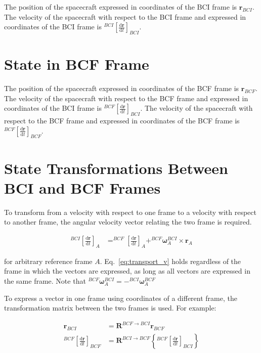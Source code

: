 \documentclass[]{article}
\newcommand{\vb}[1]{\bm{#1}} %
\newcommand{\ddt}[1]{\frac{\mathrm{d} #1}{\mathrm{d} t}} %
\begin{document}
The position of the spacecraft expressed in coordinates of the BCI frame is $\vb{r}_{BCI}$. The velocity of the spacecraft with respect to the BCI frame and expressed in coordinates of the BCI frame is $^{BCI} \left[ \ddt{\vb{r}} \right]_{BCI}$.

\section{State in BCF Frame}
\label{sec:bcf_state}

The position of the spacecraft expressed in coordinates of the BCF frame is $\vb{r}_{BCF}$. The velocity of the spacecraft with respect to the BCF frame and expressed in coordinates of the BCI frame is $^{BCF} \left[ \ddt{\vb{r}} \right]_{BCI}$. The velocity of the spacecraft with respect to the BCF frame and expressed in coordinates of the BCF frame is $^{BCF} \left[ \ddt{\vb{r}} \right]_{BCF}$.

\section{State Transformations Between BCI and BCF Frames}
\label{sec:state_transformations}

To transform from a velocity with respect to one frame to a velocity with respect to another frame, the angular velocity vector relating the two frame is required.

\begin{align}
\label{eq:transport_v}
^{BCI} \left[ \ddt{\vb{r}} \right]_A &= ^{BCF} \left[ \ddt{\vb{r}} \right]_A + ^{BCF} \vb{\omega}_A^{BCI} \times \vb{r}_A
\end{align}

\noindent for arbitrary reference frame $A$. Eq.~\eqref{eq:transport_v} holds regardless of the frame in which the vectors are expressed, as long as all vectors are expressed in the same frame. Note that $^{BCF} \vb{\omega}_A^{BCI} = - ^{BCI} \vb{\omega}_A^{BCF}$

To express a vector in one frame using coordinates of a different frame, the transformation matrix between the two frames is used. For example:

\begin{align}
\vb{r}_{BCI} &= \vb{R}^{BCF \rightarrow BCI} \vb{r}_{BCF} \\
^{BCF} \left[ \ddt{\vb{r}} \right]_{BCF} &= \vb{R}^{BCI \rightarrow BCF} \left\{^{BCF} \left[ \ddt{\vb{r}} \right]_{BCI} \right\}
\end{align}
\end{document}
